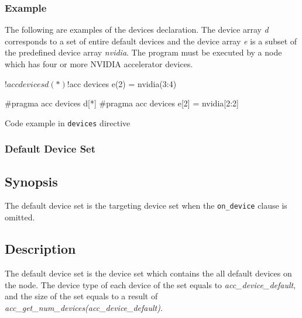 \subsubsection*{Example}
The following are examples of the devices declaration. The device array {\it d} corresponds to a set of entire default devices and the device array {\it e} is a subset of the predefined device array {\it nvidia}. The program must be executed by a node which has four or more NVIDIA accelerator devices.
%
\begin{myfigure}
\begin{minipage}{0.45\hsize}
\begin{center}
\begin{XACCFexampleL}
!$acc devices d(*)
!$acc devices e(2) = nvidia(3:4)  
\end{XACCFexampleL}
\end{center}
\end{minipage}
%
\begin{minipage}{0.53\hsize}
\begin{center}
\begin{XACCCexampleR}
#pragma acc devices d[*]
#pragma acc devices e[2] = nvidia[2:2]
\end{XACCCexampleR}
\end{center}
\end{minipage}
\caption{Code example in {\XACC} {\tt devices} directive}\label{code:devices}
\end{myfigure}


\subsubsection{Default Device Set}
\subsection*{Synopsis}
The default device set is the targeting device set when the {\tt on\_device} clause is omitted.

\subsection*{Description}
The default device set is the device set which contains the all {\OACC} default devices on the node.
The device type of each device of the set equals to {\it acc\_device\_default}, and the size of the set equals to a result of {\it acc\_get\_num\_devices(acc\_device\_default)}.


